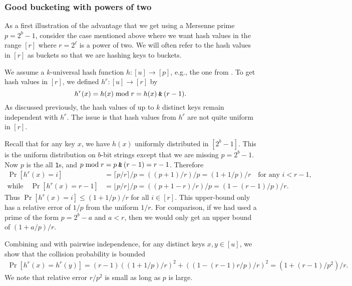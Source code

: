 \subsubsection{Good bucketing with powers of two}\label{sec:power-of-two}
As a first illustration of the advantage that we get using a
Mersenne prime $p=2^b-1$, consider the case mentioned above where we
want hash values in the range $[r]$ where $r=2^\ell$ is a power of
two. We will often refer to the hash values in $[r]$ as buckets so
that we are hashing keys to buckets.

We assume a $k$-universal hash function $h:[u]\to[p]$, e.g.,
the one from . To get hash values in $[r]$,
we defined $h^r:[u]\to[r]$ by
\[h^r(x)=h(x)\bmod r=h(x)\mathbin{\texttt{\&}} (r-1).\]
As discussed previously, the hash values of up to $k$ distinct keys remain
independent with $h^r$. The issue is that hash values from 
$h^r$ are not quite uniform in $[r]$.

Recall that for any key $x$, we have $h(x)$ uniformly distributed in $[2^b-1]$.
This is the uniform distribution on $b$-bit strings except that we are
missing $p=2^b-1$. Now $p$ is the all \texttt{1}s, and 
$p \bmod r = p\mathbin{\texttt{\&}} (r-1) = r-1$.
Therefore
\begin{align}
   \Pr[h^r(x)=i]
   &=\lceil p/r\rceil/p
   =((p+1)/r)/p
   =(1+1/p)/r
   \quad
   \text{for any $i < r-1$,}
   \label{eq:coll-ell<r-1}
   \\
   \text{while}\quad
   \Pr[h^r(x)=r-1]
   &=\lfloor p/r\rfloor/p=((p+1-r)/r)/p
   =(1-(r-1)/p)/r.
   \label{eq:coll-ell=r-1}
\end{align}
Thus $\Pr[h^r(x)=i]\leq (1+1/p)/r$ for all $i\in[r]$. This upper-bound
only has a relative error of $1/p$ from the uniform $1/r$. For
comparison, if we had used a prime of the form $p=2^b-a$ and $a<r$, then
we would only get an upper bound of $(1+a/p)/r$.

Combining  and  with
pairwise independence, for any distinct keys $x,y\in [u]$, we show that the
collision probability is bounded
\begin{equation}\begin{split}  
   \Pr[h^r(x)=h^r(y)]
      =(r-1)((1+1/p)/r)^2+((1-(r-1)r/p)/r)^2
      =(1+(r-1)/p^2)/r
   .\label{eq:coll}
\end{split}\end{equation}
We note that relative error $r/p^2$ is small as long as $p$ is
large.


